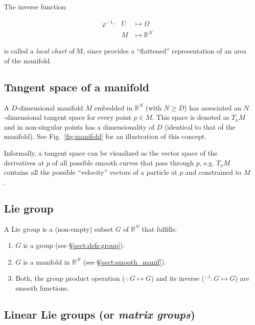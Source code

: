 \documentclass[a4paper,11pt]{report}
\begin{document}
The inverse function:

\begin{eqnarray}
 \varphi^{-1}: & U & \mapsto \Omega  \\
              & M  &  \mapsto \mathbb{R}^N
\end{eqnarray}

\noindent is called a \emph{local chart} of M, since provides a ``flattened''
representation of an area of the manifold.



\subsection{Tangent space of a manifold}
\label{sect:tang_space}

A $D$-dimensional manifold $M$ embedded in $\mathbb{R}^N$
(with $N \geq D$) has associated an $N$-dimensional tangent space
for every point $p \in M$.
This space is denoted as $T_x M$ and in non-singular points
has a dimensionality of $D$ (identical to that of the manifold).
See Fig.~\ref{fig:manifold} for an illustration of this concept.

Informally, a tangent space can be visualized as the vector space
of the derivatives at $p$ of all possible smooth curves that pass
through $p$, e.g. $T_x M$ contains all the possible
``velocity'' vectors of a particle at $p$ and constrained to $M$.



\subsection{Lie group}
\label{sect:lie_group_def}

A Lie group is a (non-empty) subset $G$ of $\mathbb{R}^N$ that fulfills:
\begin{enumerate}
 \item $G$ is a group (see \S\ref{sect:defs:group}).
 \item $G$ is a manifold in $\mathbb{R}^N$ (see \S\ref{sect:smooth_manif}).
 \item Both, the group product operation ($\cdot: G \mapsto G$)
and its inverse (${}^{-1}: G \mapsto G$) are smooth functions.
\end{enumerate}


\subsection{Linear Lie groups (or \emph{matrix groups})}
\label{sect:lie:linear}
\end{document}
